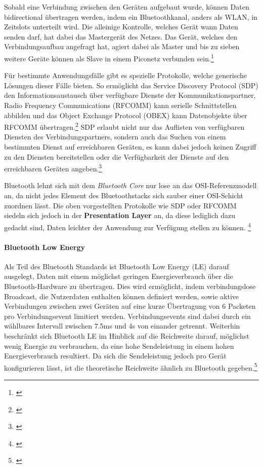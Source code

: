         Sobald eine Verbindung zwischen den Geräten aufgebaut wurde, können Daten bidirectional übertragen werden, indem ein Bluetoothkanal, anders als WLAN, in Zeitslots unterteilt wird.
        Die alleinige Kontrolle, welches Gerät wann Daten senden darf, hat dabei das Mastergerät des Netzes. Das Gerät, welches den Verbindungsaufbau angefragt hat,
        agiert dabei als Master und bis zu sieben weitere Geräte können als Slave in einem Piconetz verbunden sein.\footnote{\cite[S.379f.]{Sauter}}

        Für bestimmte Anwendungsfälle gibt es spezielle Protokolle, welche generische Lösungen dieser Fälle bieten.
        So ermöglicht das Service Discovery Protocol (SDP) den Informationsaustausch über verfügbare Dienste der Kommunikationspartner,
        Radio Frequency Communications (RFCOMM) kann serielle Schnittstellen abbilden und das Object Exchange Protocol (OBEX) kann Datenobjekte über RFCOMM übertragen.\footnote{\cite[S.229]{Lueders}}
        SDP erlaubt nicht nur das Auflisten von verfügbaren Diensten des Verbindungspartners, sondern auch das Suchen von einem bestimmten Dienst auf erreichbaren Geräten,
        es kann dabei jedoch keinen Zugriff zu den Diensten bereitstellen oder die Verfügbarkeit der Dienste auf den erreichbaren Geräten angeben.\footnote{\cite[S.395f]{Morrow}}

        Bluetooth lehnt sich mit dem {\it Bluetooth Core} nur lose an das OSI-Referenzmodell an, da nicht jedes Element des Bluetoothstacks sich sauber einer OSI-Schicht zuordnen lässt.
        Die oben vorgestellten Protokolle wie SDP oder RFCOMM siedeln sich jedoch in der {\bf Presentation Layer} an, da diese lediglich dazu gedacht sind,
        Daten leichter der Anwendung zur Verfügung stellen zu können. \footnote{\cite[S.382]{Sauter}}

        \paragraph{Bluetooth Low Energy}
        Als Teil des Bluetooth Standards ist Bluetooth Low Energy (LE) darauf ausgelegt, Daten mit einem möglichst geringen Energieverbrauch über die Bluetooth-Hardware zu übertragen.
        Dies wird ermöglicht, indem verbindungslose Broadcast, die Nutzerdaten enthalten können definiert werden, sowie aktive Verbindungen zwischen zwei Geräten auf eine kurze Übertragung von 6 Packeten pro Verbindungsevent limitiert werden. Verbindungsevents sind dabei durch ein wählbares Intervall zwischen 7.5ms und 4s von einander getrennt. Weiterhin beschränkt sich Bluetooth LE im Hinblick auf die Reichweite darauf, möglichst wenig Energie zu verbrauchen, da eine hohe Sendeleistung in einem hohen Energieverbrauch resultiert. Da sich die Sendeleistung jedoch pro Gerät konfigurieren lässt, ist die theoretische Reichweite ähnlich zu Bluetooth gegeben.\footnote{\cite[S.7f.]{Townsend}}

